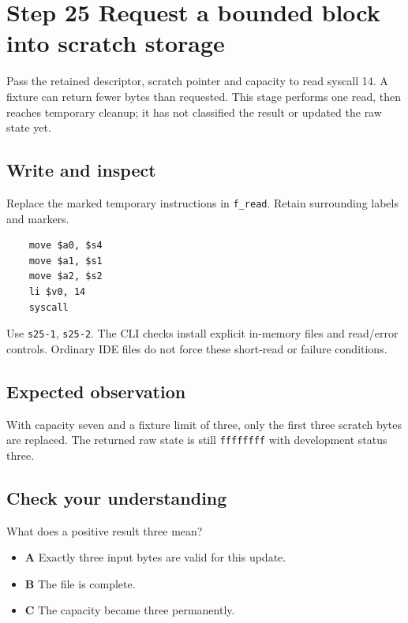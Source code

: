 \section{Step 25 Request a bounded block into scratch storage}\label{crc-s25}

Pass the retained descriptor, scratch pointer and capacity to read syscall 14. A fixture can return fewer bytes than requested. This stage performs one read, then reaches temporary cleanup; it has not classified the result or updated the raw state yet.

\subsection{Write and inspect}
Replace the marked temporary instructions in \texttt{f\_read}. Retain surrounding labels and markers.

\begin{verbatim}
    move $a0, $s4
    move $a1, $s1
    move $a2, $s2
    li $v0, 14
    syscall
\end{verbatim}

Use \texttt{s25-1}, \texttt{s25-2}. The CLI checks install explicit in-memory files and read/error controls. Ordinary IDE files do not force these short-read or failure conditions.

\subsection{Expected observation}
With capacity seven and a fixture limit of three, only the first three scratch bytes are replaced. The returned raw state is still \texttt{ffffffff} with development status three.

\subsection{Check your understanding}
What does a positive result three mean?

\begin{itemize}
  \item \textbf{A} Exactly three input bytes are valid for this update.
  \item \textbf{B} The file is complete.
  \item \textbf{C} The capacity became three permanently.
\end{itemize}
